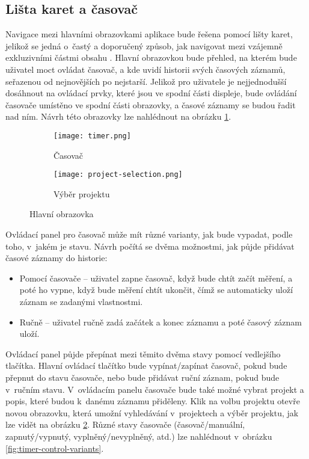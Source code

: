 \subsection{Lišta karet a časovač}

Navigace mezi hlavními obrazovkami aplikace bude řešena pomocí lišty karet, jelikož se jedná o~častý a doporučený způsob, jak navigovat mezi vzájemně exkluzivními částmi obsahu \cite{apple-guidelines-tabbars}. Hlavní obrazovkou bude přehled, na kterém bude uživatel moct ovládat časovač, a kde uvidí historii svých časových záznamů, seřazenou od nejnovějších po nejstarší. Jelikož pro uživatele je nejjednodušší dosáhnout na ovládací prvky, které jsou ve spodní části displeje, bude ovládání časovače umístěno ve spodní části obrazovky, a časové záznamy se budou řadit nad ním. Návrh této obrazovky lze nahlédnout na obrázku \ref{fig:timer}.

\begin{figure}[h]
    \centering
    \begin{subfigure}[b]{0.4\textwidth}
		\centering
		\texttt{[image: timer.png]}
		\caption{Časovač}
		\label{fig:timer}
	\end{subfigure}
	\hspace{2cm}
	\begin{subfigure}[b]{0.4\textwidth}
		\centering
		\texttt{[image: project-selection.png]}
		\caption{Výběr projektu}
		\label{fig:project-selection}
	\end{subfigure}
	\caption{Hlavní obrazovka}
	\label{fig:timer-and-project-selection}
\end{figure}

Ovládací panel pro časovač může mít různé varianty, jak bude vypadat, podle toho, v~jakém je stavu. Návrh počítá se dvěma možnostmi, jak půjde přidávat časové záznamy do historie:
\begin{itemize}
\item Pomocí časovače – uživatel zapne časovač, když bude chtít začít měření, a poté ho vypne, když bude měření chtít ukončit, čímž se automaticky uloží záznam se zadanými vlastnostmi.
\item Ručně – uživatel ručně zadá začátek a konec záznamu a poté časový záznam uloží.
\end{itemize}
Ovládací panel půjde přepínat mezi těmito dvěma stavy pomocí vedlejšího tlačítka. Hlavní ovládací tlačítko bude vypínat/zapínat časovač, pokud bude přepnut do stavu časovače, nebo bude přidávat ruční záznam, pokud bude v~ručním stavu. V~ovládacím panelu časovače bude také možné vybrat projekt a popis, které budou k~danému záznamu přiděleny. Klik na volbu projektu otevře novou obrazovku, která umožní vyhledávání v~projektech a výběr projektu, jak lze vidět na obrázku \ref{fig:project-selection}. Různé stavy časovače (časovač/manuální, zapnutý/vypnutý, vyplněný/nevyplněný, atd.) lze nahlédnout v~obrázku \ref{fig:timer-control-variants}.

